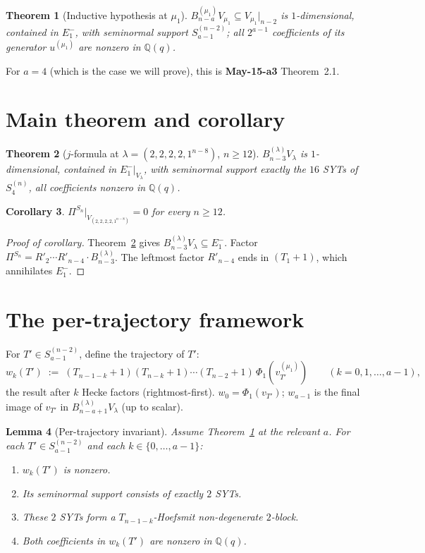 \documentclass[11pt]{article}
\newtheorem{theorem}{Theorem}
\newtheorem{lemma}[theorem]{Lemma}
\newtheorem{corollary}[theorem]{Corollary}
\theoremstyle{definition}
\begin{document}
\begin{theorem}[Inductive hypothesis at $\mu_1$]\label{thm:IH}
$B_{n-a}^{(\mu_1)} V_{\mu_1}\subseteq V_{\mu_1}|_{n-2}$ is
$1$-dimensional, contained in $E_1^-$, with seminormal support
$S_{a-1}^{(n-2)}$; all $2^{a-1}$ coefficients of its generator
$u^{(\mu_1)}$ are nonzero in $\mathbb{Q}(q)$.
\end{theorem}

For $a=4$ (which is the case we will prove), this is
\textbf{May-15-a3} Theorem~2.1.

\section{Main theorem and corollary}

\begin{theorem}[$j$-formula at $\lambda=(2,2,2,2,1^{n-8})$, $n\ge 12$]\label{thm:main}
$B_{n-3}^{(\lambda)}V_\lambda$ is $1$-dimensional, contained in
$E_1^-|_{V_\lambda}$, with seminormal support exactly the $16$ SYTs of
$S_4^{(n)}$, all coefficients nonzero in $\mathbb{Q}(q)$.
\end{theorem}

\begin{corollary}\label{cor:rank-zero-a4}
$\Pi^{S_n}|_{V_{(2,2,2,2,1^{n-8})}}=0$ for every $n\ge 12$.
\end{corollary}

\begin{proof}[Proof of corollary]
Theorem~\ref{thm:main} gives $B_{n-3}^{(\lambda)}V_\lambda\subseteq E_1^-$.
Factor $\Pi^{S_n}=R'_2\cdots R'_{n-4}\cdot B_{n-3}^{(\lambda)}$.
The leftmost factor $R'_{n-4}$ ends in $(T_1{+}1)$, which annihilates
$E_1^-$.
\end{proof}

\section{The per-trajectory framework}\label{sec:trajectory}

For $T'\in S_{a-1}^{(n-2)}$, define the trajectory of $T'$:
\[
   w_k(T')\;:=\;(T_{n-1-k}{+}1)(T_{n-k}{+}1)\cdots(T_{n-2}{+}1)\,
   \Phi_1(v_{T'}^{(\mu_1)})\qquad (k=0,1,\ldots,a-1),
\]
the result after $k$ Hecke factors (rightmost-first).  $w_0=\Phi_1(v_{T'})$;
$w_{a-1}$ is the final image of $v_{T'}$ in
$B_{n-a+1}^{(\lambda)}V_\lambda$ (up to scalar).

\begin{lemma}[Per-trajectory invariant]\label{lem:trajectory}
Assume Theorem~\ref{thm:IH} at the relevant $a$.  For each
$T'\in S_{a-1}^{(n-2)}$ and each $k\in\{0,\ldots,a-1\}$:
\begin{enumerate}[leftmargin=2em,topsep=0.3em,itemsep=0.2em]
\item $w_k(T')$ is nonzero.
\item Its seminormal support consists of exactly $2$ SYTs.
\item These $2$ SYTs form a $T_{n-1-k}$-Hoefsmit non-degenerate
$2$-block.
\item Both coefficients in $w_k(T')$ are nonzero in $\mathbb{Q}(q)$.
\end{enumerate}
\end{lemma}
\end{document}
